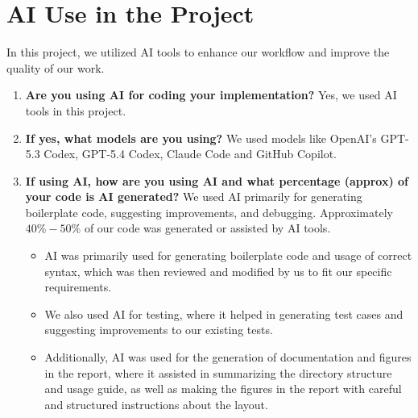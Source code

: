 \section*{AI Use in the Project}
In this project, we utilized AI tools to enhance our workflow and improve the quality of our work.
\begin{enumerate}
    \item \textbf{Are you using AI for coding your implementation?} Yes, we used AI tools in this project.
    \item \textbf{If yes, what models are you using?} We used models like OpenAI's GPT-5.3 Codex, GPT-5.4 Codex, Claude Code and GitHub Copilot.
    \item \textbf{If using AI, how are you using AI and what percentage (approx) of your code is AI generated?} We used AI primarily for generating boilerplate code, suggesting improvements, and debugging. Approximately $40\% - 50\%$ of our code was generated or assisted by AI tools.
    \begin{itemize}
        \item AI was primarily used for generating boilerplate code and usage of correct syntax, which was then reviewed and modified by us to fit our specific requirements.
        \item We also used AI for testing, where it helped in generating test cases and suggesting improvements to our existing tests.
        \item Additionally, AI was used for the generation of documentation and figures in the report, where it assisted in summarizing the directory structure and usage guide, as well as making the figures in the report with careful and structured instructions about the layout.
    \end{itemize}
\end{enumerate}